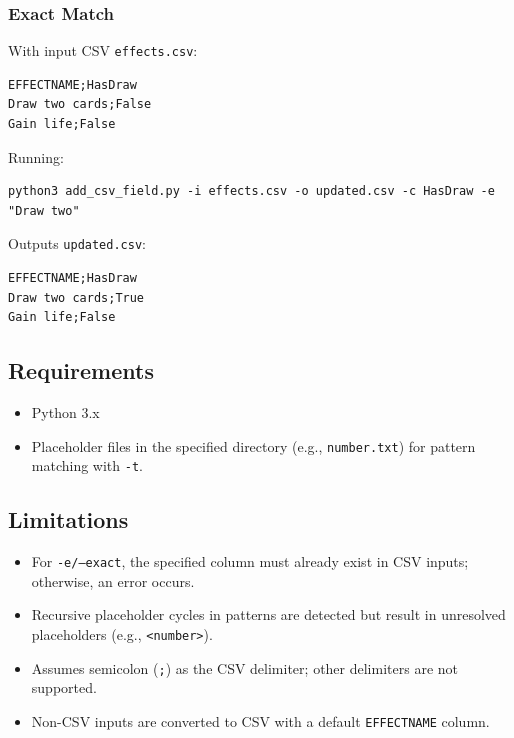 \subsubsection{Exact Match}
With input CSV \texttt{effects.csv}:
\begin{lstlisting}
EFFECTNAME;HasDraw
Draw two cards;False
Gain life;False
\end{lstlisting}
Running:
\begin{lstlisting}[style=terminalstyle]
python3 add_csv_field.py -i effects.csv -o updated.csv -c HasDraw -e "Draw two"
\end{lstlisting}
Outputs \texttt{updated.csv}:
\begin{lstlisting}
EFFECTNAME;HasDraw
Draw two cards;True
Gain life;False
\end{lstlisting}

\subsection{Requirements}
\begin{itemize}
    \item Python 3.x
    \item Placeholder files in the specified directory (e.g., \texttt{number.txt}) for pattern matching with \texttt{-t}.
\end{itemize}

\subsection{Limitations}
\begin{itemize}
    \item For \texttt{-e/--exact}, the specified column must already exist in CSV inputs; otherwise, an error occurs.
    \item Recursive placeholder cycles in patterns are detected but result in unresolved placeholders (e.g., \texttt{<number>}).
    \item Assumes semicolon (\texttt{;}) as the CSV delimiter; other delimiters are not supported.
    \item Non-CSV inputs are converted to CSV with a default \texttt{EFFECTNAME} column.
\end{itemize}














